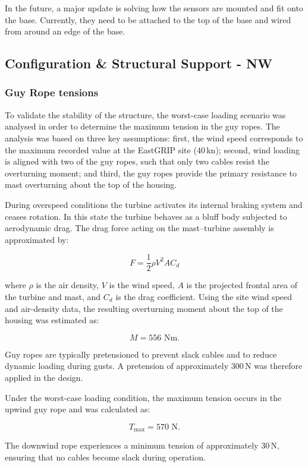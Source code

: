 \documentclass[11pt,a4paper]{article}
\begin{document}
In the future, a major update is solving how the sensors are mounted and fit onto the base. Currently, they need to be attached to the top of the base and wired from around an edge of the base.

\subsection{Configuration \& Structural Support - NW}

\subsubsection{Guy Rope tensions}
To validate the stability of the structure, the worst-case loading scenario was analysed in order to determine the maximum tension in the guy ropes. The analysis was based on three key assumptions: first, the wind speed corresponds to the maximum recorded value at the EastGRIP site (40\,kn); second, wind loading is aligned with two of the guy ropes, such that only two cables resist the overturning moment; and third, the guy ropes provide the primary resistance to mast overturning about the top of the housing.

During overspeed conditions the turbine activates its internal braking system and ceases rotation. In this state the turbine behaves as a bluff body subjected to aerodynamic drag. The drag force acting on the mast--turbine assembly is approximated by:

\[
F = \frac{1}{2}\rho V^2 A C_d
\]

where $\rho$ is the air density, $V$ is the wind speed, $A$ is the projected frontal area of the turbine and mast, and $C_d$ is the drag coefficient. Using the site wind speed and air-density data, the resulting overturning moment about the top of the housing was estimated as:

\[
M = 556 \text{ Nm}.
\]

Guy ropes are typically pretensioned to prevent slack cables and to reduce dynamic loading during gusts. A pretension of approximately 300\,N was therefore applied in the design.

Under the worst-case loading condition, the maximum tension occurs in the upwind guy rope and was calculated as:

\[
T_{\text{max}} = 570 \text{ N}.
\]

The downwind rope experiences a minimum tension of approximately 30\,N, ensuring that no cables become slack during operation.
\end{document}
